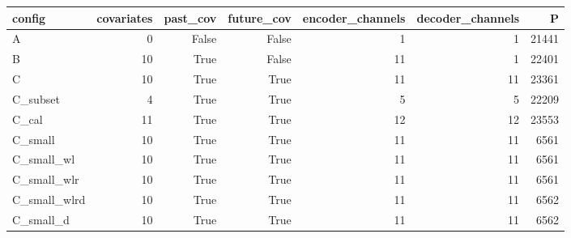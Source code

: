\begin{tabular}{lrrrrrr}
\toprule
config & covariates & past\_cov & future\_cov & encoder\_channels & decoder\_channels & P \\
\midrule
A & 0 & False & False & 1 & 1 & 21441 \\
B & 10 & True & False & 11 & 1 & 22401 \\
C & 10 & True & True & 11 & 11 & 23361 \\
C\_subset & 4 & True & True & 5 & 5 & 22209 \\
C\_cal & 11 & True & True & 12 & 12 & 23553 \\
C\_small & 10 & True & True & 11 & 11 & 6561 \\
C\_small\_wl & 10 & True & True & 11 & 11 & 6561 \\
C\_small\_wlr & 10 & True & True & 11 & 11 & 6561 \\
C\_small\_wlrd & 10 & True & True & 11 & 11 & 6562 \\
C\_small\_d & 10 & True & True & 11 & 11 & 6562 \\
\bottomrule
\end{tabular}
